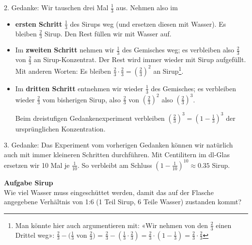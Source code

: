 2. Gedanke: Wir tauschen drei Mal $\frac13$ aus. Nehmen also im
\begin{itemize}
\item \textbf{ersten Schritt} $\frac13$ des Sirups weg (und ersetzen diesen mit Wasser).
  Es bleiben $\frac23$ Sirup. Den Rest füllen wir mit Wasser auf.
\item Im \textbf{zweiten Schritt} nehmen wir $\frac13$ des Gemisches
weg; es verbleiben also $\frac23$ von $\frac23$ an
Sirup-Konzentrat. Der Rest wird immer wieder mit Sirup aufgefüllt. Mit
anderen Worten: Es bleiben $\frac23 \cdot \frac23
= \left(\frac23\right)^2$ an Sirup\footnote{Man könnte hier auch argumentieren mit: «Wir nehmen von den $\frac23$ einen Drittel weg»: $\frac23 - (\frac13$ von $\frac23)$ = $\frac23 - (\frac13 \cdot\frac23) = \frac23 \cdot(1-\frac13)=\frac23\cdot\frac23$}.
\item Im \textbf{dritten Schritt} entnehmen wir wieder $\frac13$ des
Gemisches; es verbleiben wieder $\frac23$ vom bisherigen Sirup, also
$\frac23$ von $(\frac23)^2$ also $\left(\frac23\right)^3$.

Beim dreistufigen Gedankenexperiment verbleiben
$\left(\frac23\right)^3 = \left(1-\frac13\right)^3$ der ursprünglichen Konzentration.
\end{itemize}
\leserluft

3. Gedanke: Das Experiment vom vorherigen Gedanken können wir natürlich auch mit immer kleineren Schritten durchführen.
Mit Centilitern \zB im dl-Glas ersetzen wir 10 Mal je $\frac1{10}$. 
So verbleibt am Schluss $\left(1-\frac{1}{10}\right)^{10}\approx 0.35$ Sirup.

\newpage

\textbf{Aufgabe Sirup}\\
Wie viel Wasser muss eingeschüttet werden, damit das auf der Flasche
angegebene Verhältnis von 1:6 (1 Teil Sirup, 6 Teile Wasser) zustanden
kommt?


